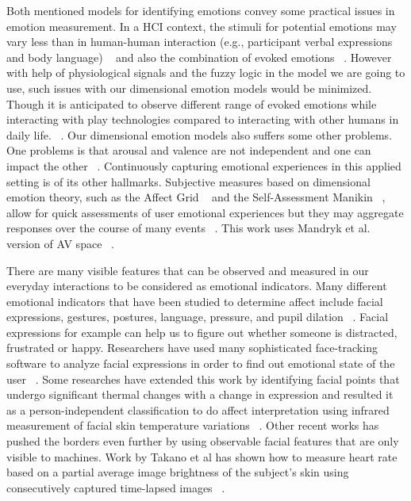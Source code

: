 \documentclass{uofsthesis-cs}
\begin{document}
Both mentioned models for identifying emotions convey some practical issues in emotion measurement. In a HCI context, the stimuli for potential emotions may vary less than in human-human interaction (e.g., participant verbal expressions and body language) ~\cite{zhang2010service} and also the combination of evoked emotions ~\cite{peter2006emotion}. However with help of physiological signals and the fuzzy logic in the model we are going to use, such issues with our dimensional emotion models would be minimized. Though it is anticipated to observe different range of evoked emotions while interacting with play technologies compared to interacting with other humans in daily life. ~\cite{zhang2010service}. Our dimensional emotion models also suffers some other problems. One problems is that arousal and valence are not independent and one can impact the other ~\cite{mandryk2007fuzzy}. Continuously capturing emotional experiences in this applied setting is of its other hallmarks. Subjective measures based on dimensional emotion theory, such as the Affect Grid ~\cite{russell1989affect} and the Self-Assessment Manikin ~\cite{bradley1994measuring}, allow for quick assessments of user emotional experiences but they may aggregate responses over the course of many events ~\cite{zhang2010service}. This work uses Mandryk et al. version of AV space ~\cite{mandryk2007fuzzy}.

There are many visible features that can be observed and measured in our everyday interactions to be considered as emotional indicators. Many different emotional indicators that have been studied to determine affect include facial expressions, gestures, postures, language, pressure, and pupil dilation ~\cite{picard2003affective}. Facial expressions for example can help us to figure out whether someone is distracted, frustrated or happy. Researchers have used many sophisticated face-tracking software to analyze facial expressions in order to find out emotional state of the user ~\cite{partala2006real, sebe2006emotion}. Some researches have extended this work by identifying facial points that undergo significant thermal changes with a change in expression and resulted it as a person-independent classification to do affect interpretation using infrared measurement of facial skin temperature variations ~\cite{khan2006automated}. Other recent works has pushed the borders even further by using observable facial features that are only visible to machines. Work by Takano et al has shown how to measure heart rate based on a partial average image brightness of the subject's skin using consecutively captured time-lapsed images ~\cite{takano2007heart}.
\end{document}
